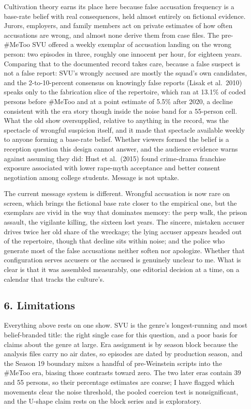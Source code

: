 \documentclass[
]{article}
\newcounter{none} %
\begin{document}
Cultivation theory earns its place here because false accusation
frequency is a base-rate belief with real consequences, held almost
entirely on fictional evidence. Jurors, employers, and family members
act on private estimates of how often accusations are wrong, and almost
none derive them from case files. The pre-\#MeToo SVU offered a weekly
exemplar of accusation landing on the wrong person: two episodes in
three, roughly one innocent per hour, for eighteen years. Comparing that
to the documented record takes care, because a false suspect is not a
false report: SVU's wrongly accused are mostly the squad's own
candidates, and the 2-to-10-percent consensus on knowingly false reports
(Lisak et al.~2010) speaks only to the fabrication slice of the
repertoire, which ran at 13.1\% of coded persons before \#MeToo and at a
point estimate of 5.5\% after 2020, a decline consistent with the era
story though inside the noise band for a 55-person cell. What the old
show oversupplied, relative to anything in the record, was the spectacle
of wrongful suspicion itself, and it made that spectacle available
weekly to anyone forming a base-rate belief. Whether viewers formed the
belief is a reception question this design cannot answer, and the
audience evidence warns against assuming they did: Hust et al.~(2015)
found crime-drama franchise exposure associated with lower rape-myth
acceptance and better consent negotiation among college students.
Message is not uptake.

The current message system is different. Wrongful accusation is now rare
on screen, which brings the fictional base rate closer to the empirical
one, but the exemplars are vivid in the way that dominates memory: the
perp walk, the prison assault, the vigilante killing, the sixteen lost
years. The sincere, mistaken accuser drives twice her old share of the
wreckage; the lying accuser appears headed out of the repertoire, though
that decline sits within noise; and the police who generate most of the
false accusations neither soften nor apologize. Whether that
configuration serves accusers or the accused is genuinely unclear to me.
What is clear is that it was assembled measurably, one editorial
decision at a time, on a calendar that tracks the culture's.

\subsection{6. Limitations}\label{limitations}

Everything above rests on one show. SVU is the genre's longest-running
and most belief-branded title: the right single case for this question,
and a poor basis for claims about the genre at large. Era assignment is
by season block because the analysis files carry no air dates, so
episodes are dated by production season, and the Season 19 boundary
mixes a handful of pre-Weinstein scripts into the \#MeToo era, biasing
those contrasts toward zero. The two later eras contain 39 and 55
persons, so their percentage estimates are coarse; I have flagged which
movements clear the noise threshold, the pooled coercion test is
nonsignificant, and the U-shape claim rests on the block series and is
exploratory.
\end{document}
